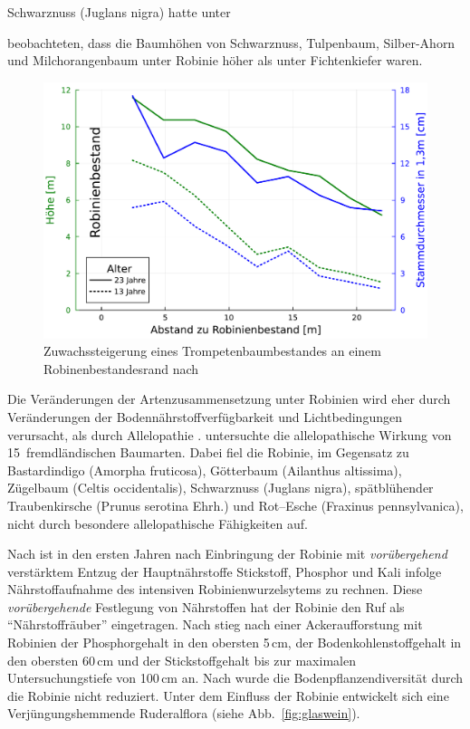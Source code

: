 \documentclass[twocolumn]{scrartcl}
\begin{document}
Schwarznuss (Juglans nigra) hatte unter 

beobachteten, dass die Baumhöhen von Schwarznuss, Tulpenbaum,
Silber-Ahorn und Milchorangenbaum unter Robinie höher als unter
Fichtenkiefer waren.

\begin{figure}[htbp]
  \centering
  \includegraphics[width=.9\linewidth]{./bild/bestandesrand}
  \caption{Zuwachssteigerung eines Trompetenbaumbestandes an einem
    Robinenbestandesrand nach
    \citet{ferguson1922robinie,chapman1935robinie}}
  \label{fig:bestandesrand}
\end{figure}

Die Veränderungen der Artenzusammensetzung unter Robinien wird eher
durch Veränderungen der Bodennährstoffverfügbarkeit und
Lichtbedingungen verursacht, als durch Allelopathie
\citep{vitkova2017robinie}.  \citet{csiszar2009allelopathy}
untersuchte die allelopathische Wirkung von 15~fremdländischen
Baumarten. Dabei fiel die Robinie, im Gegensatz zu Bastardindigo
(Amorpha fruticosa), Götterbaum (Ailanthus altissima), Zügelbaum
(Celtis occidentalis), Schwarznuss (Juglans nigra), spätblühender
Traubenkirsche (Prunus serotina Ehrh.) und Rot--Esche (Fraxinus
pennsylvanica), nicht durch besondere allelopathische Fähigkeiten auf.

Nach \citet{mueller1991robinie} ist in den
ersten Jahren nach Einbringung der Robinie mit \emph{vorübergehend}
verstärktem Entzug der Hauptnährstoffe Stickstoff, Phosphor und Kali
infolge Nährstoffaufnahme des intensiven Robinienwurzelsytems zu
rechnen. Diese \emph{vorübergehende} Festlegung von Nährstoffen hat
der Robinie den Ruf als \enquote{Nährstoffräuber} eingetragen.
Nach \citet{kou2016robinieBoden} stieg nach einer Ackeraufforstung mit
Robinien der Phosphorgehalt in den obersten 5\,cm, der
Bodenkohlenstoffgehalt in den obersten 60\,cm und der Stickstoffgehalt
bis zur maximalen Untersuchungstiefe von 100\,cm an.
Nach \citet{sitzia2012robinie} wurde die Bodenpflanzendiversität durch
die Robinie nicht reduziert. Unter dem Einfluss der Robinie entwickelt
sich eine Verjüngungshemmende Ruderalflora (siehe
Abb.~\ref{fig:glaswein}).
\end{document}
